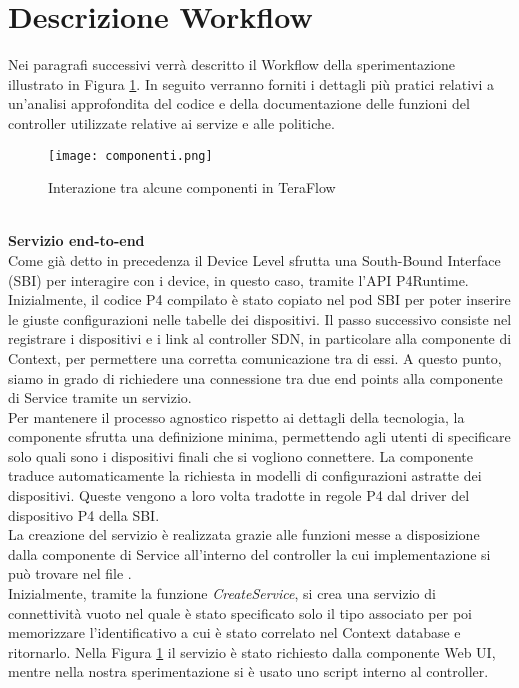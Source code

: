\section{Descrizione Workflow}
Nei paragrafi successivi verrà descritto il Workflow della sperimentazione illustrato in Figura \ref{fig:componenti}. In seguito verranno 
forniti i dettagli più pratici relativi a un'analisi approfondita del codice e della documentazione delle funzioni del controller utilizzate relative ai servize e alle politiche.
\begin{figure}[h]
    \centering
   \texttt{[image: componenti.png]}
    \caption{Interazione tra alcune componenti in TeraFlow}
    \label{fig:componenti}
\end{figure}
\\\textbf{Servizio end-to-end}
\\Come già detto in precedenza il Device Level sfrutta una South-Bound Interface (SBI) per interagire con i device, in questo caso, tramite l'API P4Runtime. 
Inizialmente, il codice P4 compilato è stato copiato nel pod SBI per poter inserire le giuste configurazioni nelle tabelle dei dispositivi.
Il passo successivo consiste nel registrare i dispositivi e i link al controller SDN, in particolare alla componente di Context, per permettere una corretta comunicazione tra di essi.
A questo punto, siamo in grado di richiedere una connessione tra due end points alla componente di Service tramite un servizio.
\\Per mantenere il processo agnostico rispetto ai dettagli della tecnologia, la componente  
sfrutta una definizione minima, permettendo agli utenti di specificare solo quali sono i dispositivi finali che si vogliono connettere.
La componente traduce automaticamente la richiesta in modelli di configurazioni astratte dei dispositivi. 
Queste vengono a loro volta tradotte in regole P4 dal driver del dispositivo P4 della SBI.
\\La creazione del servizio è realizzata grazie alle funzioni messe a disposizione dalla componente di Service all'interno del controller la cui implementazione si può trovare nel file \cite{servserv}. 
\\Inizialmente, tramite la funzione \textit{CreateService}, si crea una servizio di connettività vuoto nel quale è stato specificato solo il tipo associato per poi memorizzare l'identificativo  
a cui è stato correlato nel Context database e ritornarlo.
Nella Figura \ref{fig:componenti} il servizio è stato richiesto dalla componente Web UI, mentre nella nostra sperimentazione si è usato uno script interno al controller.
